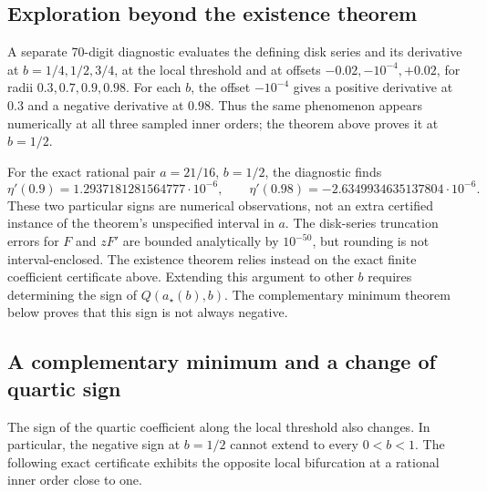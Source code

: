 \subsection{Exploration beyond the existence theorem}

A separate 70-digit diagnostic evaluates the defining disk series and its
derivative at $b=1/4,1/2,3/4$, at the local threshold and at offsets
$-0.02,-10^{-4},+0.02$, for radii $0.3,0.7,0.9,0.98$. For each
$b$, the offset $-10^{-4}$ gives a positive derivative at $0.3$ and
a negative derivative at $0.98$. Thus the same phenomenon appears
numerically at all three sampled inner orders; the theorem above proves
it at $b=1/2$.

For the exact rational pair $a=21/16$, $b=1/2$, the diagnostic finds
\[
 \eta'(0.9)=1.2937181281564777\cdot10^{-6},\qquad
 \eta'(0.98)=-2.6349934635137804\cdot10^{-6}.
\]
These two particular signs are numerical observations, not an extra
certified instance of the theorem's unspecified interval in $a$.
The disk-series truncation errors for $F$ and $zF'$ are bounded
analytically by $10^{-50}$, but rounding is not interval-enclosed.
The existence theorem relies instead on the exact finite coefficient
certificate above. Extending this argument to other $b$ requires
determining the sign of $Q(a_\star(b),b)$. The complementary
minimum theorem below proves that this sign is not always negative.

\subsection{A complementary minimum and a change of quartic sign}
\label{rwloc:turn:sec:minimum}

The sign of the quartic coefficient along the local threshold also
changes. In particular, the negative sign at $b=1/2$ cannot extend to
every $0<b<1$. The following exact certificate exhibits the opposite
local bifurcation at a rational inner order close to one.

